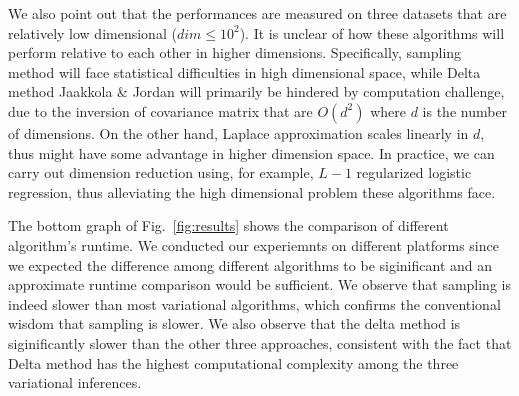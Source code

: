 We also point out that the performances are measured on three datasets that are
relatively low dimensional ($dim \le 10^2$). It is unclear of how these
algorithms will perform relative to each other in higher dimensions.
Specifically, sampling method will face statistical difficulties in high
dimensional space, while Delta method Jaakkola \& Jordan will primarily be
hindered by computation challenge, due to the inversion of covariance matrix
that are $O(d^2)$ where $d$ is the number of dimensions. On the other hand,
Laplace approximation scales linearly in $d$, thus might have some advantage
in higher dimension space. In practice, we can carry out dimension
reduction using, for example, $L-1$ regularized logistic regression, thus
alleviating the high dimensional problem these algorithms face. 

The bottom graph of Fig.~\ref{fig:results} shows the comparison of different
algorithm's runtime. We conducted our experiemnts on different platforms since
we expected the difference among different algorithms to be siginificant and
an approximate runtime comparison would be sufficient. We observe that
sampling is indeed slower than most variational algorithms, which confirms the
conventional wisdom that sampling is slower. We also observe that the delta
method is siginificantly slower than the other three approaches, consistent
with the fact that Delta method has the highest computational complexity among
the three variational inferences.

